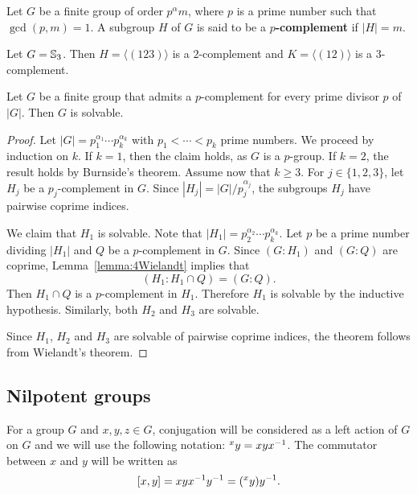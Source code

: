 \begin{definition}
Let $G$ be a finite group of order $p^{\alpha}m$, where $p$ is a prime number such that 
$\gcd(p,m)=1$. A subgroup 
$H$ of $G$ is said to be a \textbf{$p$-complement} if $|H|=m$. 
\end{definition}

\begin{example}
Let $G=\mathbb{S}_3$. Then $H=\langle (123)\rangle$ is a $2$-complement and 
$K=\langle (12)\rangle$ is a $3$-complement.
\end{example}

\begin{theorem}[Hall]
\label{theorem:Hall:solvable}
Let $G$ be a finite group that admits a $p$-complement for every prime divisor $p$ of $|G|$. 
Then $G$ is solvable. 
\end{theorem}

\begin{proof}
	Let $|G|=p_1^{\alpha_1}\cdots
	p_k^{\alpha_k}$ with $p_1<\cdots<p_k$ prime numbers. We proceed by induction on $k$. 
	If $k=1$, then the claim holds, as $G$ is a $p$-group. If $k=2$, the result holds by
        Burnside's theorem. Assume now that 
	$k\geq3$. For $j\in\{1,2,3\}$, let $H_j$ be a $p_j$-complement in 
	$G$. Since $|H_j|=|G|/p_j^{\alpha_j}$, the subgroups $H_j$ have pairwise coprime indices.

	We claim that $H_1$ is solvable. Note that $|H_1|=p_2^{\alpha_2}\cdots
	p_k^{\alpha_k}$. Let $p$ be a prime number dividing $|H_1|$ and $Q$ be a 
	$p$-complement in $G$. 
	Since $(G:H_1)$ and $(G:Q)$ are
	coprime, Lemma~\ref{lemma:4Wielandt} implies that  
	\[
	(H_1:H_1\cap Q)=(G:Q). 
	\]
	Then $H_1\cap Q$ is a $p$-complement in $H_1$.  Therefore $H_1$ is
	solvable by the inductive hypothesis. Similarly, both $H_2$ and 
	$H_3$ are solvable.

	Since $H_1$, $H_2$ and $H_3$ are solvable of pairwise coprime indices, 
        the theorem follows from Wielandt's theorem. 
\end{proof}

\subsection{Nilpotent groups}

For a group $G$ and $x,y,z\in G$, conjugation will be considered as a left action of $G$ on $G$ 
and we will use the following notation: $\prescript{x}{}y=xyx^{-1}$. The commutator between $x$ and $y$ 
will be written as 
\[
[x,y]=xyx^{-1}y^{-1}=(\prescript{x}{}y)y^{-1}.
\]


